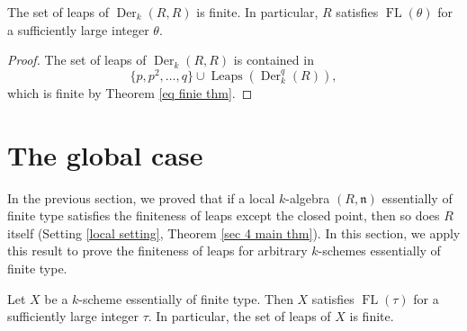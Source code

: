 \documentclass{amsart}
\newcommand{\FL}[1]{\operatorname{FL}(#1)}
\begin{document}
\begin{theorem}\label{sec 4 main thm}
    The set of leaps of $\operatorname{Der}_k(R,R)$ is finite. In particular, $R$ satisfies $\FL{\theta}$ for a sufficiently large integer $\theta$.
\end{theorem}

\begin{proof}
    The set of leaps of $\operatorname{Der}_k(R,R)$ is contained in
    $$\{p,p^2,\dots,q\}\cup \operatorname{Leaps}(\operatorname{Der}_k^q(R)),$$
    which is finite by Theorem \ref{eq finie thm}.
\end{proof}

\section{The global case}
In the previous section, we proved that if a local $k$-algebra $(R,\mathfrak{n})$ essentially of finite type satisfies the finiteness of leaps except the closed point, then so does $R$ itself (Setting \ref{local setting}, Theorem \ref{sec 4 main thm}). In this section, we apply this result to prove the finiteness of leaps for arbitrary $k$-schemes essentially of finite type.

\begin{theorem}\label{main thm global}
    Let $X$ be a $k$-scheme essentially of finite type. Then $X$ satisfies $\FL{\tau}$ for a sufficiently large integer $\tau$. In particular, the set of leaps of $X$ is finite.
\end{theorem}
\end{document}

